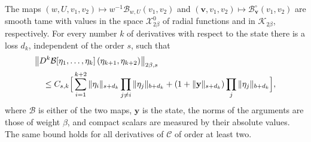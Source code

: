 \begin{lemma}
\label{lem:posterior-two-weight}
The maps $(w,U,v_1,v_2)\mapsto w^{-1}\mathcal B_{w,U}(v_1,v_2)$ and
$(\mathbf v,v_1,v_2)\mapsto\mathcal B^\circ_{\mathbf v}(v_1,v_2)$
are smooth tame with values in the space $\mathcal X^0_{2\beta}$ of
radial functions and in $\mathcal K_{2\beta}$, respectively. For every
number $k$ of derivatives with respect to the state there is a loss
$d_k$, independent of the order $s$, such that
\begin{equation}\label{eq:posterior-multilinear-bound}
 \begin{split}
 &\bigl\|D^k\mathcal B[\eta_1,\ldots,\eta_k]\,
                         (\eta_{k+1},\eta_{k+2})\bigr\|_{2\beta,s}\\
 &\quad\le C_{s,k}\Bigl[\,
   \sum_{i=1}^{k+2}\|\eta_i\|_{s+d_k}
                    \prod_{j\ne i}\|\eta_j\|_{b+d_k}
   +(1+\|\mathbf y\|_{s+d_k})
                    \prod_j\|\eta_j\|_{b+d_k}\Bigr],
 \end{split}
\end{equation}
where $\mathcal B$ is either of the two maps, $\mathbf y$ is the
state, the norms of the arguments are those of weight $\beta$, and
compact scalars are measured by their absolute values. The same bound
holds for all derivatives of $\mathcal C$ of order at least two.
\end{lemma}

